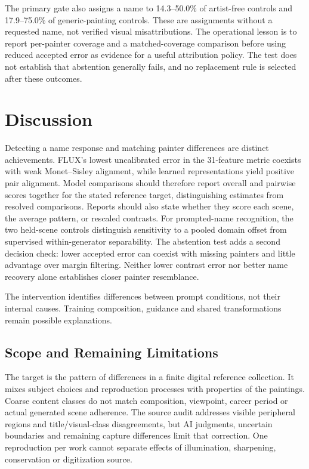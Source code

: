 The primary gate also assigns a name to 14.3--50.0\% of artist-free controls
and 17.9--75.0\% of generic-painting controls. These are assignments without a
requested name, not verified visual misattributions. The operational lesson
is to report per-painter coverage and a matched-coverage comparison before
using reduced accepted error as evidence for a useful attribution policy.
The test does not establish that abstention generally fails, and no replacement
rule is selected after these outcomes.

\section{Discussion}\label{sec:discussion}
Detecting a name response and matching painter differences are distinct achievements.
FLUX's lowest uncalibrated error in the 31-feature metric coexists with weak
Monet--Sisley alignment, while learned representations yield positive pair alignment.
Model comparisons should therefore report overall and pairwise scores together
for the stated reference target, distinguishing estimates from resolved comparisons.
Reports should also state whether they score each scene, the average pattern,
or rescaled contrasts. For prompted-name recognition, the two held-scene
controls distinguish sensitivity to a pooled domain offset from supervised
within-generator separability. The abstention test adds a second decision check: lower accepted error can
coexist with missing painters and little advantage over margin filtering.
Neither lower contrast error nor better name recovery alone establishes closer
painter resemblance.

The intervention identifies differences between prompt conditions, not their
internal causes. Training composition, guidance and shared transformations remain
possible explanations.

\subsection{Scope and Remaining Limitations}
The target is the pattern of differences in a finite digital reference
collection. It mixes subject choices and reproduction processes with properties
of the paintings. Coarse content classes do not match composition, viewpoint,
career period or actual generated scene adherence. The source audit addresses
visible peripheral regions and title/visual-class disagreements, but AI
judgments, uncertain boundaries and remaining capture differences limit that
correction. One reproduction per work cannot separate effects of illumination,
sharpening, conservation or digitization source.

